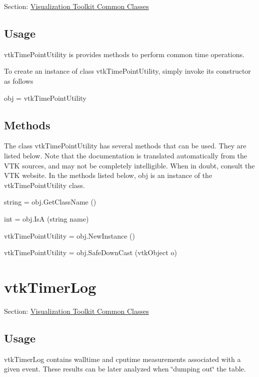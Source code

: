 Section\-: \hyperlink{sec_vtkcommon}{Visualization Toolkit Common Classes} \hypertarget{vtkwidgets_vtkxyplotwidget_Usage}{}\subsection{Usage}\label{vtkwidgets_vtkxyplotwidget_Usage}
vtk\-Time\-Point\-Utility is provides methods to perform common time operations.

To create an instance of class vtk\-Time\-Point\-Utility, simply invoke its constructor as follows \begin{DoxyVerb}  obj = vtkTimePointUtility
\end{DoxyVerb}
 \hypertarget{vtkwidgets_vtkxyplotwidget_Methods}{}\subsection{Methods}\label{vtkwidgets_vtkxyplotwidget_Methods}
The class vtk\-Time\-Point\-Utility has several methods that can be used. They are listed below. Note that the documentation is translated automatically from the V\-T\-K sources, and may not be completely intelligible. When in doubt, consult the V\-T\-K website. In the methods listed below, {\ttfamily obj} is an instance of the vtk\-Time\-Point\-Utility class. 
\begin{DoxyItemize}
\item {\ttfamily string = obj.\-Get\-Class\-Name ()}  
\item {\ttfamily int = obj.\-Is\-A (string name)}  
\item {\ttfamily vtk\-Time\-Point\-Utility = obj.\-New\-Instance ()}  
\item {\ttfamily vtk\-Time\-Point\-Utility = obj.\-Safe\-Down\-Cast (vtk\-Object o)}  
\end{DoxyItemize}\hypertarget{vtkcommon_vtktimerlog}{}\section{vtk\-Timer\-Log}\label{vtkcommon_vtktimerlog}
Section\-: \hyperlink{sec_vtkcommon}{Visualization Toolkit Common Classes} \hypertarget{vtkwidgets_vtkxyplotwidget_Usage}{}\subsection{Usage}\label{vtkwidgets_vtkxyplotwidget_Usage}
vtk\-Timer\-Log contains walltime and cputime measurements associated with a given event. These results can be later analyzed when \char`\"{}dumping out\char`\"{} the table.

